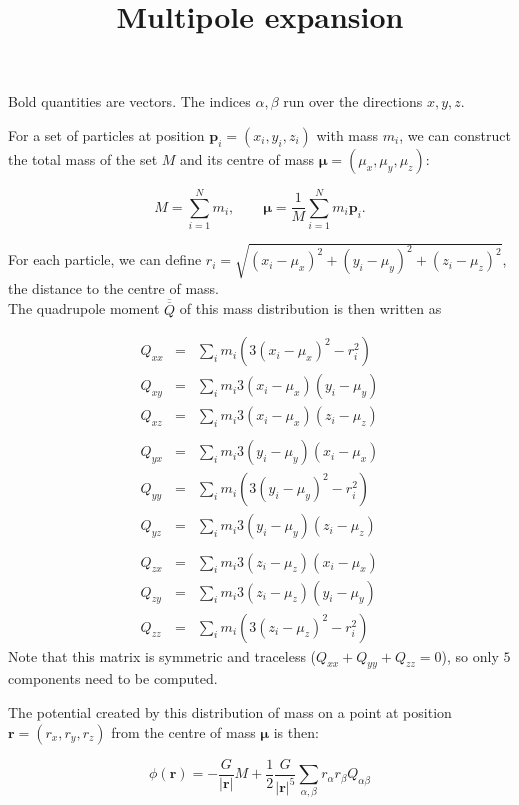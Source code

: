 \documentclass[a4paper,10pt]{article}
\title{Multipole expansion}
\newcommand{\rr}{\mathbf{r}}
\newcommand{\p}[1]{\mathbf{p}_#1}
\newcommand{\muu}{\boldsymbol{\mu}}
\begin{document}
\maketitle

Bold quantities are vectors. The indices $\alpha,\beta$ run over the directions $x,y,z$.

For a set of particles at position $\p{i}=(x_i, y_i, z_i)$ with mass $m_i$, we can construct the total mass of the set 
$M$ and its centre of mass $\muu=(\mu_x, \mu_y, \mu_z)$:

\begin{equation}
 M = \sum_{i=1}^N m_i, \qquad \muu = \frac{1}{M} \sum_{i=1}^N m_i\p{i}.
\end{equation}

For each particle, we can define $r_i= \sqrt{(x_i-\mu_x)^2 + (y_i-\mu_y)^2 + (z_i-\mu_z)^2}$, the distance to the 
centre of mass.\\
The quadrupole moment $\overline{\overline{Q}}$ of this mass distribution is then written as

\begin{eqnarray}
 Q_{xx} &=& \sum_i m_i \left( 3(x_i-\mu_x)^2 - r_i^2\right) \\
 Q_{xy} &=& \sum_i m_i 3(x_i-\mu_x)(y_i-\mu_y) \\
 Q_{xz} &=& \sum_i m_i 3(x_i-\mu_x)(z_i-\mu_z) \\
 ~& & \nonumber\\
 Q_{yx} &=& \sum_i m_i 3(y_i-\mu_y)(x_i-\mu_x) \\
 Q_{yy} &=& \sum_i m_i \left( 3(y_i-\mu_y)^2 - r_i^2\right) \\
 Q_{yz} &=& \sum_i m_i 3(y_i-\mu_y)(z_i-\mu_z) \\
 ~& &\nonumber\\
 Q_{zx} &=& \sum_i m_i 3(z_i-\mu_z)(x_i-\mu_x)  \\
 Q_{zy} &=& \sum_i m_i 3(z_i-\mu_z)(y_i-\mu_y) \\
 Q_{zz} &=& \sum_i m_i \left( 3(z_i-\mu_z)^2 - r_i^2\right)
\end{eqnarray}
Note that this matrix is symmetric and traceless ($Q_{xx}+Q_{yy}+Q_{zz}=0$), so only $5$ components need to be 
computed. \\

\pagebreak

The potential created by this distribution of mass on a point at position $\rr=(r_x,r_y,r_z)$ from the centre of mass 
$\muu$ is then:

\begin{equation}
 \phi(\rr) = -\frac{G}{|\rr|}M + \frac{1}{2}\frac{G}{|\rr|^5}\sum_{\alpha,\beta} r_\alpha r_\beta Q_{\alpha\beta}
\end{equation}
\end{document}
